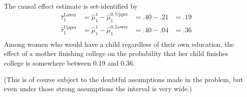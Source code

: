 \documentclass[10pt]{article}
\begin{document}
The causal effect estimate is set-identified by
$$
\begin{aligned}
\hat\tau_1^\text{Lower} &= \hat\mu^1_1 - \hat\mu^{0,\text{Upper}}_1 &= .40 - .21 &= .19 \\
\hat\tau_1^\text{Upper} &= \hat\mu^1_1 - \hat\mu^{0,\text{Lower}}_1 &= .40 - .04 &= .36 \\
\end{aligned}
$$
Among women who would have a child regardless of their own education, the effect of a mother finishing college on the probability that her child finishes college is somewhere between 0.19 and 0.36.

(This is of course subject to the doubtful assumptions made in the problem, but even under those strong assumptions the interval is very wide.)
\end{document}
